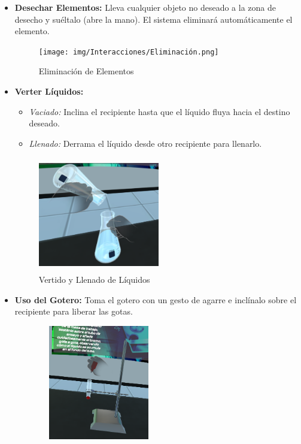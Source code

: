 \begin{itemize}
    \item \textbf{Desechar Elementos:}  
    Lleva cualquier objeto no deseado a la zona de desecho y suéltalo (abre la mano). El sistema eliminará automáticamente el elemento.
    \begin{figure}[thbp]
        \centering
        \texttt{[image: img/Interacciones/Eliminación.png]}
        \caption{Eliminación de Elementos}
        \label{fig:Eliminación de Elementos}
    \end{figure}
    \newpage
    \item \textbf{Verter Líquidos:}  
    \begin{itemize}
        \item \textit{Vaciado:} Inclina el recipiente hasta que el líquido fluya hacia el destino deseado.  
        \item \textit{Llenado:} Derrama el líquido desde otro recipiente para llenarlo.  
    \end{itemize}
    \begin{figure}[thbp]
        \centering
        \includegraphics[width=0.5\textwidth, height = 5cm]{img/Interacciones/Vertido.png}
        \caption{Vertido y Llenado de Líquidos}
        \label{fig:Vertido y Llenado de Líquidos}
    \end{figure}
    \item \textbf{Uso del Gotero:}  
    Toma el gotero con un gesto de agarre e inclínalo sobre el recipiente para liberar las gotas.
    \begin{figure}[thbp]
        \centering
        \includegraphics[width=0.5\textwidth, height = 5cm]{img/Interacciones/Agregar_Liquido.png}

\end{figure}
\end{itemize}

